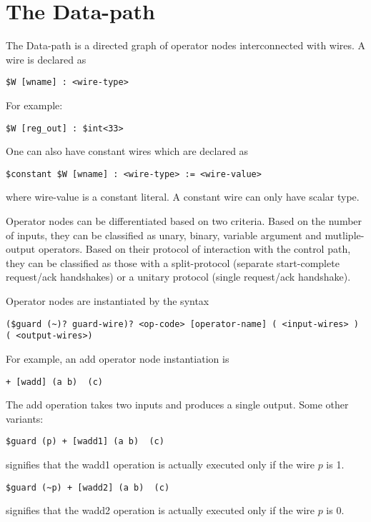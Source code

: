 \documentclass{article}
\begin{document}
\section{The Data-path} \label{sec:Datapath}

The Data-path is a directed graph of operator nodes
interconnected with wires.
A wire is declared as
\begin{verbatim}
$W [wname] : <wire-type>
\end{verbatim}
For example:
\begin{verbatim}
$W [reg_out] : $int<33>
\end{verbatim}

One can also have constant wires which are declared
as
\begin{verbatim}
$constant $W [wname] : <wire-type> := <wire-value>
\end{verbatim}
where wire-value is a constant literal.  A constant wire can only have 
scalar type.

Operator nodes can be differentiated based on two criteria.
Based on the number of inputs, they can be classified
as unary, binary, variable argument and mutliple-output
operators.  Based on their protocol of interaction with
the control path, they can be classified as those
with a split-protocol (separate start-complete request/ack
handshakes) or a unitary protocol (single request/ack handshake).


Operator nodes are instantiated by the syntax
\begin{verbatim}
($guard (~)? guard-wire)? <op-code> [operator-name] ( <input-wires> )  ( <output-wires>)
\end{verbatim}
For example, an add operator node instantiation is 
\begin{verbatim}
+ [wadd] (a b)  (c)
\end{verbatim}
The add operation takes two inputs and produces a single output.
Some other variants:
\begin{verbatim}
$guard (p) + [wadd1] (a b)  (c)
\end{verbatim}
signifies that the wadd1 operation is actually executed only if
the wire $p$ is 1.
\begin{verbatim}
$guard (~p) + [wadd2] (a b)  (c)
\end{verbatim}
signifies that the wadd2 operation is actually executed only if
the wire $p$ is 0.
\end{document}
